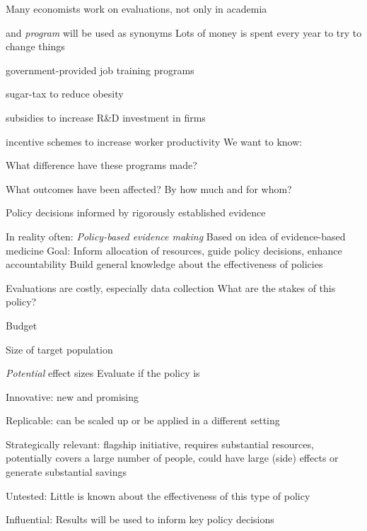 \documentclass[
  25pt,         %
  a4paper,
  landscape,
  Screen4to3,
  footrule ]{foils}
\newcommand{\sectiontitle}{}
\newcommand{\xx}{\item[{\small $\bullet$}]}
\begin{document}
\bi 
\xx Many economists work on evaluations, not only in academia
\ei

\ei

\renewcommand{\sectiontitle}{5.1 Introduction and basic concepts}


\bi
{} and {\textit {program}} will be used as synonyms
\x Lots of money is spent every year to try to change things
\bi
\xx government-provided job training programs
\xx sugar-tax to reduce obesity
\xx subsidies to increase R\&D investment in firms
\xx incentive schemes to increase worker productivity
\ei
\x We want to know:
\bi
\xx What difference have these programs made?
\xx What outcomes have been affected? By how much and for whom?
\ei
\ei

\bi 
\x Policy decisions informed by rigorously established evidence
\bi 
\xx In reality often: \textit{Policy-based evidence making}
\ei
\x Based on idea of evidence-based medicine
\x Goal: Inform allocation of resources, guide policy decisions, enhance accountability
\x Build general knowledge about the effectiveness of policies
\ei

\begin{small}

\bi 
\x Evaluations are costly, especially data collection
\x What are the stakes of this policy?
\bi 
\xx Budget
\xx Size of target population
\xx {\textit{Potential}} effect sizes
\ei
\x Evaluate if the policy is
\bi 
\xx Innovative: new and promising
\xx Replicable: can be scaled up or be applied in a different setting
\xx Strategically relevant: flagship initiative, requires substantial resources, 
potentially covers a large number of people, could have large (side) effects or generate substantial savings
\xx Untested: Little is known about the effectiveness of this type of policy
\xx Influential: Results will be used to inform key policy decisions
\ei
\ei
\end{small}

\end{document}

